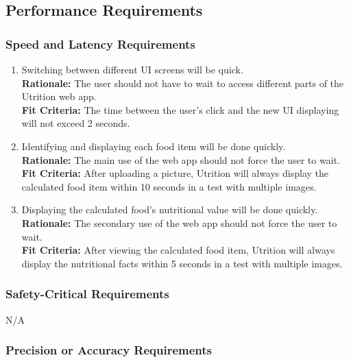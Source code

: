 \documentclass[12pt]{article}
\begin{document}
\subsection{Performance Requirements}

\subsubsection{Speed and Latency Requirements}

\begin{enumerate}[start=1,label={PR\arabic*.}]
	\item Switching between different UI screens will be quick.\\
	\textbf{Rationale:} The user should not have to wait to access different parts of the Utrition web app.\\
	\textbf{Fit Criteria:} The time between the user’s click and the new UI displaying will not exceed 2 seconds.
	\item Identifying and displaying each food item will be done quickly.\\
	\textbf{Rationale:} The main use of the web app should not force the user to wait.\\
	\textbf{Fit Criteria:} After uploading a picture, Utrition will always display the calculated food item within 10 seconds in a test with multiple images.
	\item Displaying the calculated food’s nutritional value will be done quickly. \\
	\textbf{Rationale:} The secondary use of the web app should not force the user to wait. \\
	\textbf{Fit Criteria:} After viewing the calculated food item, Utrition will always display the nutritional facts within 5 seconds in a test with multiple images.
\end{enumerate}

\subsubsection{Safety-Critical Requirements}
\hspace{1.5cm}N/A

\subsubsection{Precision or Accuracy Requirements}
\end{document}
